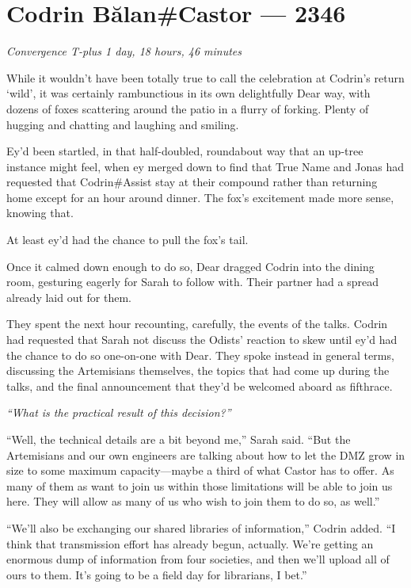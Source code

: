 \hypertarget{codrin-bux103lancastor-2346}{%
\chapter{Codrin Bălan\#Castor — 2346}}

\begin{center}
\emph{Convergence T-plus 1 day, 18 hours, 46 minutes}
\end{center}

\noindent While it wouldn't have been totally true to call the celebration at Codrin's return `wild', it was certainly rambunctious in its own delightfully Dear way, with dozens of foxes scattering around the patio in a flurry of forking. Plenty of hugging and chatting and laughing and smiling.

Ey'd been startled, in that half-doubled, roundabout way that an up-tree instance might feel, when ey merged down to find that True Name and Jonas had requested that Codrin\#Assist stay at their compound rather than returning home except for an hour around dinner. The fox's excitement made more sense, knowing that.

At least ey'd had the chance to pull the fox's tail.

Once it calmed down enough to do so, Dear dragged Codrin into the dining room, gesturing eagerly for Sarah to follow with. Their partner had a spread already laid out for them.

They spent the next hour recounting, carefully, the events of the talks. Codrin had requested that Sarah not discuss the Odists' reaction to skew until ey'd had the chance to do so one-on-one with Dear. They spoke instead in general terms, discussing the Artemisians themselves, the topics that had come up during the talks, and the final announcement that they'd be welcomed aboard as fifthrace.

\emph{``What is the practical result of this decision?''}

``Well, the technical details are a bit beyond me,'' Sarah said. ``But the Artemisians and our own engineers are talking about how to let the DMZ grow in size to some maximum capacity—maybe a third of what Castor has to offer. As many of them as want to join us within those limitations will be able to join us here. They will allow as many of us who wish to join them to do so, as well.''

``We'll also be exchanging our shared libraries of information,'' Codrin added. ``I think that transmission effort has already begun, actually. We're getting an enormous dump of information from four societies, and then we'll upload all of ours to them. It's going to be a field day for librarians, I bet.''

